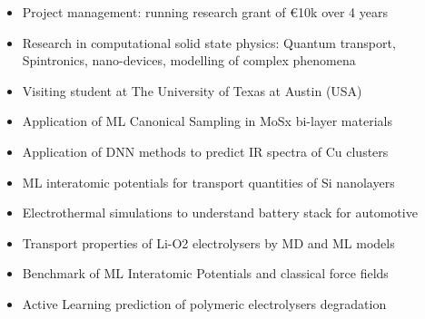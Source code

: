 \documentclass[10pt,a4paper,ragged2e,withhyper]{altacv}
\begin{document}
\begin{paracol}{2}
\begin{itemize}
\item Project management: running research grant of \euro{10k} over 4 years
\item Research in computational solid state physics: Quantum transport, Spintronics, nano-devices, modelling of complex phenomena
\item Visiting student at The University of Texas at Austin (USA)
\end{itemize}

{}

\begin{itemize}
\item Application of ML Canonical Sampling in MoSx bi-layer materials 
\item Application of DNN methods to predict IR spectra of Cu clusters
\item ML interatomic potentials for transport quantities of Si nanolayers
\end{itemize}
\divider

\begin{itemize}
\item Electrothermal simulations to understand battery stack for automotive
\item Transport properties of Li-O2 electrolysers by MD and ML models
\item Benchmark of ML Interatomic Potentials and classical force fields %
\item Active Learning prediction of polymeric electrolysers degradation
\end{itemize}
\divider


\end{paracol}
\end{document}
